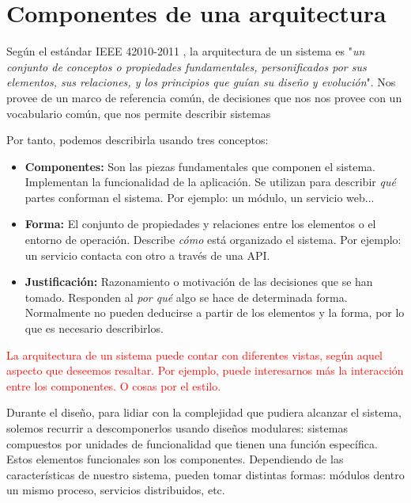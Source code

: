 \section{Componentes de una arquitectura}

Según el estándar IEEE 42010-2011 \cite{ieeeStandard420102011Systems2011}, la arquitectura de un sistema es "\textit{un conjunto de conceptos o propiedades fundamentales, personificados por sus elementos, sus relaciones, y los principios que guían su diseño y evolución}". Nos provee de un marco de referencia común, de decisiones que nos nos provee con un vocabulario común, que nos permite describir sistemas

Por tanto, podemos describirla usando tres conceptos: \cite{perryFoundationsStudySoftware1992}

    \begin{itemize}
        \item \textbf{Componentes:} Son las piezas fundamentales que componen el sistema. Implementan la funcionalidad de la aplicación. Se utilizan para describir \textit{qué} partes conforman el sistema. Por ejemplo: un módulo, un servicio web...

        \item \textbf{Forma:} El conjunto de propiedades y relaciones entre los elementos o el entorno de operación. Describe \textit{cómo} está organizado el sistema. Por ejemplo: un servicio contacta con otro a través de una API.

        \item \textbf{Justificación:} Razonamiento o motivación de las decisiones que se han tomado. Responden al \textit{por qué} algo se hace de determinada forma. Normalmente no pueden deducirse a partir de los elementos y la forma, por lo que es necesario describirlos.

    \end{itemize}

\textcolor{red}{La arquitectura de un sistema puede contar con diferentes vistas, según aquel aspecto que deseemos resaltar. Por ejemplo, puede interesarnos más la interacción entre los componentes. O cosas por el estilo.}

Durante el diseño, para lidiar con la complejidad que pudiera alcanzar el sistema, solemos recurrir a descomponerlos usando diseños modulares: sistemas compuestos por unidades de funcionalidad que tienen una función específica. \cite{taylorSoftwareArchitectureFoundations2009} Estos elementos funcionales son los componentes. Dependiendo de las características de nuestro sistema, pueden tomar distintas formas: módulos dentro un mismo proceso, servicios distribuidos, etc.

